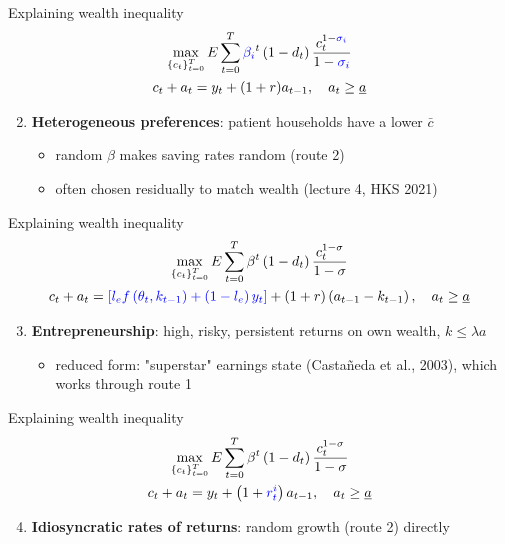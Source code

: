 \documentclass[10pt,english,10pt]{beamer}
\begin{document}
\begin{frame}{Explaining wealth inequality}
\[
\begin{gathered}\max_{\left\{ c_{t}\right\} _{t=0}^{T}}E\sum_{t=0}^{T}\textcolor{blue}{\beta_{i}}^{t}\left(1-d_{t}\right)\frac{c_{t}^{1-\textcolor{blue}{\sigma_{i}}}}{1-\textcolor{blue}{\sigma_{i}}}\\
c_{t}+a_{t}=y_{t}+(1+r)a_{t-1},\quad a_{t}\geq\underline{a}
\end{gathered}
\]
\begin{enumerate}
\setcounter{enumi}{1}
\item \textbf{Heterogeneous preferences}: patient households have a lower $\bar{c}$
\begin{itemize}
\item random $\beta$ makes saving rates random (route 2)
\item often chosen residually to match wealth (lecture 4, HKS 2021)
\end{itemize}
\end{enumerate}
\end{frame}

\begin{frame}{Explaining wealth inequality}
\[
\begin{gathered}\max_{\left\{ c_{t}\right\} _{t=0}^{T}}E\sum_{t=0}^{T}\beta^{t}\left(1-d_{t}\right)\frac{c_{t}^{1-\sigma}}{1-\sigma}\\
c_{t}+a_{t}=\textcolor{blue}{\left[l_{e}f\left(\theta_{t},k_{t-1}\right)+\left(1-l_{e}\right)y_{t}\right]}+(1+r)\left(a_{t-1}-k_{t-1}\right),\quad a_{t}\geq\underline{a}
\end{gathered}
\]
\begin{enumerate}
\setcounter{enumi}{2}
\item \textbf{Entrepreneurship}: high, risky, persistent returns on own wealth, $k\leq\lambda a$
\begin{itemize}
\item reduced form: "superstar" earnings state (Castañeda et al., 2003), which works through route 1
\end{itemize}
\end{enumerate}
\end{frame}

\begin{frame}{Explaining wealth inequality}
\[
\begin{gathered}\max_{\left\{ c_{t}\right\} _{t=0}^{T}}E\sum_{t=0}^{T}\beta^{t}\left(1-d_{t}\right)\frac{c_{t}^{1-\sigma}}{1-\sigma}\\
c_{t}+a_{t}=y_{t}+\left(1+\textcolor{blue}{r_{t}^{i}}\right)a_{t-1},\quad a_{t}\geq\underline{a}
\end{gathered}
\]
\begin{enumerate}
\setcounter{enumi}{3}
\item \textbf{Idiosyncratic rates of returns}: random growth (route 2) directly
\end{enumerate}
\end{frame}
\end{document}
